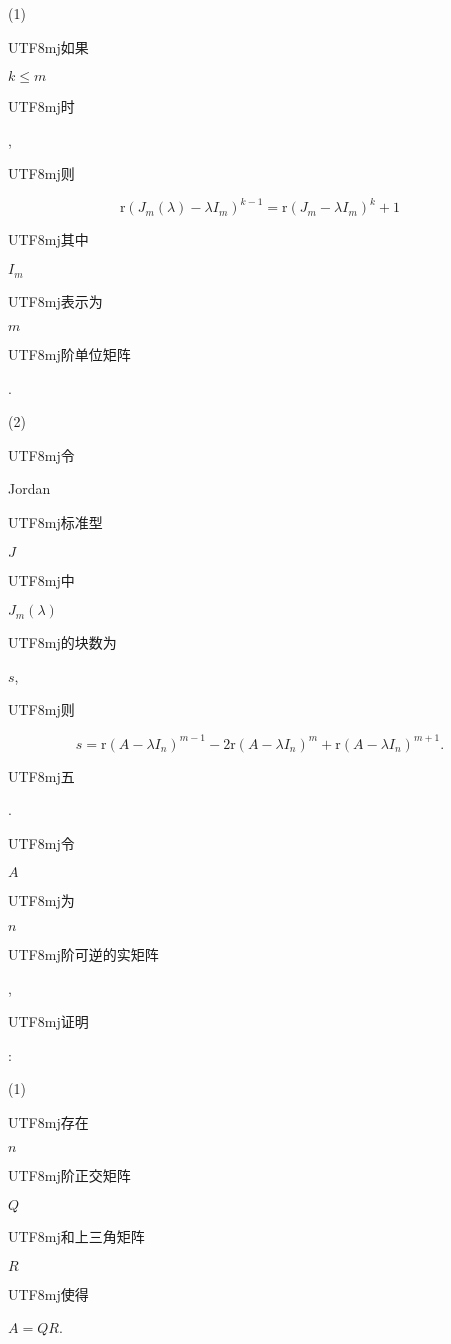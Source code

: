 \documentclass[10pt]{article}
\begin{document}
(1) \begin{CJK}{UTF8}{mj}如果\end{CJK} $k \leqslant m$ \begin{CJK}{UTF8}{mj}时\end{CJK}, \begin{CJK}{UTF8}{mj}则\end{CJK}
$$
\mathrm{r}\left(J_{m}(\lambda)-\lambda I_{m}\right)^{k-1}=\mathrm{r}\left(J_{m}-\lambda I_{m}\right)^{k}+1
$$
\begin{CJK}{UTF8}{mj}其中\end{CJK} $I_{m}$ \begin{CJK}{UTF8}{mj}表示为\end{CJK} $m$ \begin{CJK}{UTF8}{mj}阶单位矩阵\end{CJK}.

(2) \begin{CJK}{UTF8}{mj}令\end{CJK} Jordan \begin{CJK}{UTF8}{mj}标准型\end{CJK} $J$ \begin{CJK}{UTF8}{mj}中\end{CJK} $J_{m}(\lambda)$ \begin{CJK}{UTF8}{mj}的块数为\end{CJK} $s$, \begin{CJK}{UTF8}{mj}则\end{CJK}
$$
s=\mathrm{r}\left(A-\lambda I_{n}\right)^{m-1}-2 \mathrm{r}\left(A-\lambda I_{n}\right)^{m}+\mathrm{r}\left(A-\lambda I_{n}\right)^{m+1} .
$$
\begin{CJK}{UTF8}{mj}五\end{CJK}. \begin{CJK}{UTF8}{mj}令\end{CJK} $A$ \begin{CJK}{UTF8}{mj}为\end{CJK} $n$ \begin{CJK}{UTF8}{mj}阶可逆的实矩阵\end{CJK}, \begin{CJK}{UTF8}{mj}证明\end{CJK}:

(1) \begin{CJK}{UTF8}{mj}存在\end{CJK} $n$ \begin{CJK}{UTF8}{mj}阶正交矩阵\end{CJK} $Q$ \begin{CJK}{UTF8}{mj}和上三角矩阵\end{CJK} $R$ \begin{CJK}{UTF8}{mj}使得\end{CJK} $A=Q R$.
\end{document}
